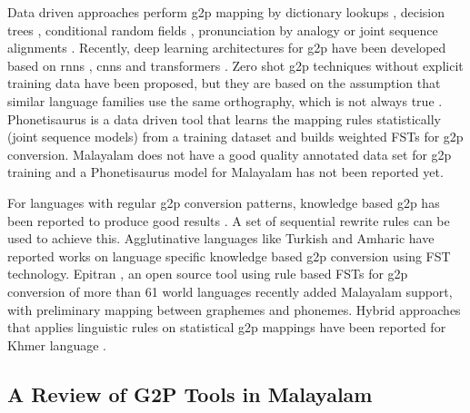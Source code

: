Data driven approaches perform \gls{g2p} mapping by dictionary lookups \cite{black1998issues}, decision trees \cite{black1998issues}, conditional random fields \cite{fosler2013conditional}, pronunciation by analogy
\cite{yvon1996grapheme} or joint sequence alignments \cite{bisani2008joint}. Recently, deep learning architectures for \gls{g2p} have been developed based on \gls{rnn}s \cite{yao2015sequence}, \gls{cnn}s \cite{yolchuyeva2019grapheme} and transformers \cite{sevinj2019transformer}. Zero shot \gls{g2p}  techniques without explicit training data have been proposed, but they are based on the assumption that similar language families
use the same orthography, which is not always true \cite{li-etal-2022-zero}. Phonetisaurus \cite{novak_minematsu_hirose_2016} is a data driven tool that learns the mapping rules statistically (joint sequence models) from a training dataset and builds weighted FSTs for \gls{g2p} conversion. Malayalam does not have a good quality annotated data set for \gls{g2p} training and a Phonetisaurus model for Malayalam has not been reported yet.

For languages with regular \gls{g2p} conversion patterns, knowledge based \gls{g2p} has been reported to produce good results \cite{li-etal-2022-zero, sar2019applying}. A set of sequential rewrite rules can be used to achieve this. Agglutinative languages like Turkish \cite{oflazer2006architecture} and Amharic \cite{anberbir2011grapheme} have reported works on language specific knowledge based \gls{g2p} conversion using FST technology. Epitran  \cite{mortensen2018epitran}, an open source tool using rule based FSTs for \gls{g2p} conversion of more than 61 world languages recently added Malayalam support, with preliminary mapping between graphemes and phonemes. Hybrid approaches that applies linguistic rules on statistical \gls{g2p} mappings have been reported for Khmer language \cite{sar2019applying}.

% 





\subsection{A Review of G2P Tools in Malayalam}
\label{sec:Literature-g2preview}

